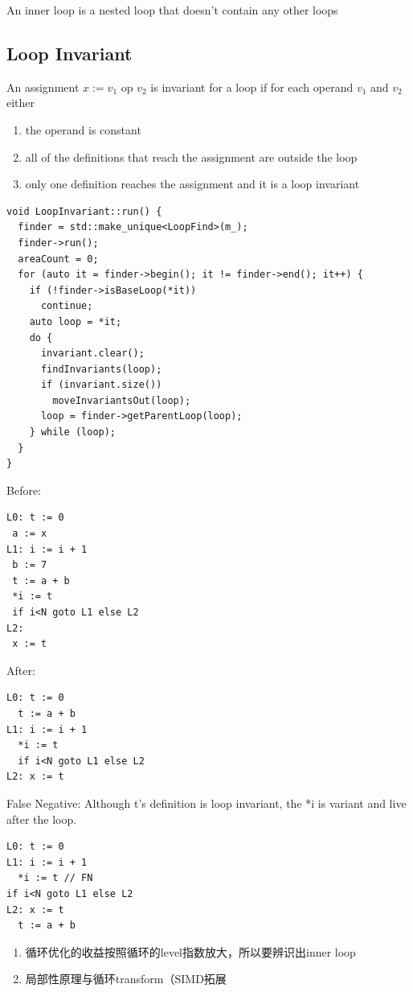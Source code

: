 \documentclass[a4paper]{article}
\theoremstyle{definition}
\begin{document}
An inner loop is a nested loop that doesn't contain any other loops
\subsection{Loop Invariant\cite{15411lec17}}
An assignment $x:=v_{1}$ op $v_{2}$ is invariant for a loop if for each operand $v_{1}$ and $v_{2}$ either
\begin{enumerate}
    \item the operand is constant
    \item all of the definitions that reach the assignment are outside the loop
    \item only one definition reaches the assignment and it is a loop invariant
\end{enumerate}
\begin{verbatim}
void LoopInvariant::run() {
  finder = std::make_unique<LoopFind>(m_);
  finder->run();
  areaCount = 0;
  for (auto it = finder->begin(); it != finder->end(); it++) {
    if (!finder->isBaseLoop(*it))
      continue;
    auto loop = *it;
    do {
      invariant.clear();
      findInvariants(loop);
      if (invariant.size())
        moveInvariantsOut(loop);
      loop = finder->getParentLoop(loop);
    } while (loop);
  }
}
\end{verbatim}
Before:
\begin{verbatim}
L0: t := 0
 a := x
L1: i := i + 1
 b := 7
 t := a + b 
 *i := t 
 if i<N goto L1 else L2
L2:
 x := t
\end{verbatim}
After:
\begin{verbatim}
L0: t := 0
  t := a + b 
L1: i := i + 1 
  *i := t 
  if i<N goto L1 else L2
L2: x := t
\end{verbatim}
False Negative: Although t’s definition is loop invariant, the *i is variant and live after the loop.
\begin{verbatim}
L0: t := 0
L1: i := i + 1 
  *i := t // FN
if i<N goto L1 else L2
L2: x := t 
  t := a + b
\end{verbatim}
\begin{enumerate}
    \item 循环优化的收益按照循环的level指数放大，所以要辨识出inner loop
\item 局部性原理与循环transform（SIMD拓展
\end{enumerate}
\end{document}
